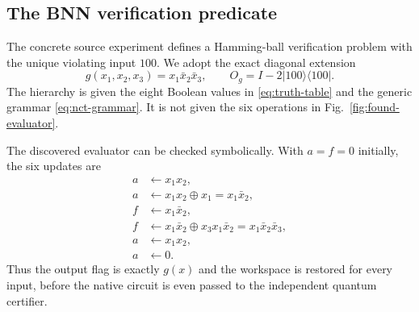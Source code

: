 \subsection{The BNN verification predicate}

The concrete source experiment defines a Hamming-ball verification problem with the unique violating input $100$.  We adopt the exact diagonal extension
\begin{equation}
g(x_1,x_2,x_3)=x_1\bar x_2\bar x_3,
\qquad
O_g=I-2\lvert100\rangle\!\langle100\rvert.
\label{eq:bnn-predicate}
\end{equation}
The hierarchy is given the eight Boolean values in \eqref{eq:truth-table} and the generic grammar \eqref{eq:nct-grammar}.  It is not given the six operations in Fig.~\ref{fig:found-evaluator}.

The discovered evaluator can be checked symbolically.  With $a=f=0$ initially, the six updates are
\begin{align}
a&\leftarrow x_1x_2,\\
a&\leftarrow x_1x_2\oplus x_1=x_1\bar x_2,\\
f&\leftarrow x_1\bar x_2,\\
f&\leftarrow x_1\bar x_2\oplus x_3x_1\bar x_2
=x_1\bar x_2\bar x_3,\\
a&\leftarrow x_1x_2,\\
a&\leftarrow0.
\end{align}
Thus the output flag is exactly $g(x)$ and the workspace is restored for every input, before the native circuit is even passed to the independent quantum certifier.
